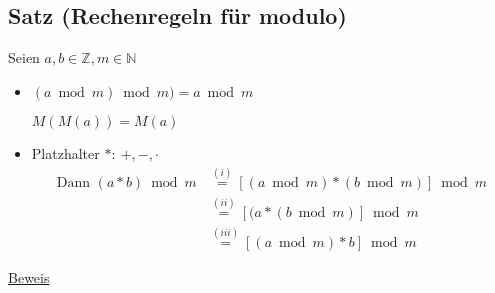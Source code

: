 \documentclass[a4paper, 12pt, twoside] {article}
\begin{document}

\subsection{Satz (Rechenregeln für modulo)} %
Seien $a, b \in \mathbb{Z}, m \in \mathbb{N}$

\begin{itemize}

\item $(a \bmod m) \bmod m ) = a \bmod m$

$M(M(a)) = M(a)$

\item Platzhalter $*:\ +,-,\cdot$
\begin{align*}
\text{Dann } (a * b) \bmod m  &\overset{(i)}{=}  [(a \bmod m) * (b \bmod m)] \bmod m \\
 &\overset{(ii)}{=}  [(a * (b \bmod m)] \bmod m \\
 &\overset{(iii)}{=}  [(a \bmod m) * b] \bmod m
\end{align*}

\end{itemize}

\underline{Beweis}
\end{document}
